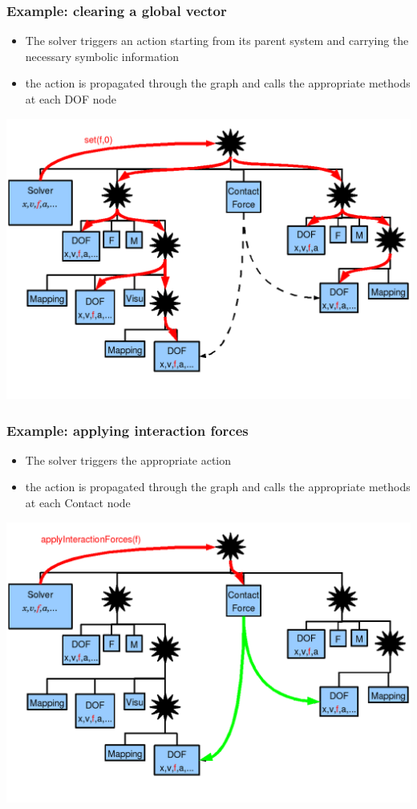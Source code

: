 \documentclass[a4paper,compress]{beamer}
\begin{document}
\begin{frame}
 \frametitle{Example: clearing a global vector}
\begin{itemize}
 \item The solver triggers an action starting from its parent system and carrying the necessary symbolic information
\item the action is propagated through the graph and calls the appropriate methods at each DOF node
\end{itemize}
\begin{center}
 \includegraphics[width=0.8\linewidth]{layered-contacts-action-resetF.png}
\end{center}

\end{frame}



\begin{frame}
 \frametitle{Example: applying interaction forces}
\begin{itemize}
 \item The solver triggers the appropriate action
\item the action is propagated through the graph and calls the appropriate methods at each Contact node
\end{itemize}
\begin{center}
 \includegraphics[width=0.8\linewidth]{layered-contacts-action-applyInteractionForces.png}
\end{center}

\end{frame}
\end{document}
